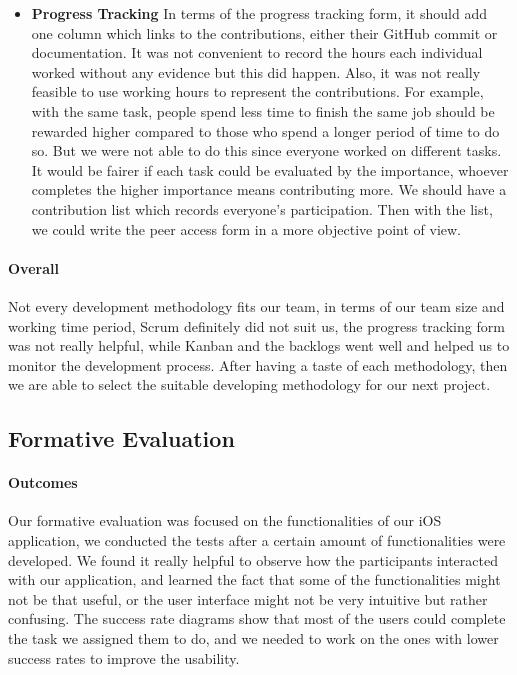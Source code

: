 \documentclass[12pt,a4paper]{article}
\begin{document}
\begin{itemize}
          \item {\bf Progress Tracking} In terms of the progress tracking form, it should add one column which links to the contributions, either their GitHub commit or documentation. It was not convenient to record the hours each individual worked without any evidence but this did happen. Also, it was not really feasible to use working hours to represent the contributions. For example, with the same task, people spend less time to finish the same job should be rewarded higher compared to those who spend a longer period of time to do so. But we were not able to do this since everyone worked on different tasks. It would be fairer if each task could be evaluated by the importance, whoever completes the higher importance means contributing more. We should have a contribution list which records everyone's participation. Then with the list, we could write the peer access form in a more objective point of view.
        \end{itemize}

        \paragraph{Overall} Not every development methodology fits our team, in terms of our team size and working time period, Scrum definitely did not suit us, the progress tracking form was not really helpful, while Kanban and the backlogs went well and helped us to monitor the development process. After having a taste of each methodology, then we are able to select the suitable developing methodology for our next project.

      \subsection{Formative Evaluation}
        \paragraph{Outcomes} Our formative evaluation was focused on the functionalities of our iOS application, we conducted the tests after a certain amount of functionalities were developed. We found it really helpful to observe how the participants interacted with our application, and learned the fact that some of the functionalities might not be that useful, or the user interface might not be very intuitive but rather confusing. The success rate diagrams show that most of the users could complete the task we assigned them to do, and we needed to work on the ones with lower success rates to improve the usability. 
\end{document}
